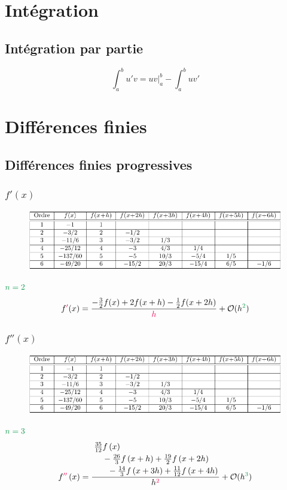 \documentclass[]{article}
\begin{document}
\begin{multicols}{3}











\section{Intégration}
\subsection{Intégration par partie}
$$\int_{a}^{b}u'v=uv\Big|_{a}^{b}-\int_{a}^{b}uv'$$
\section{Différences finies}
\subsection{Différences finies progressives}
\subsubsection{$f'(x)$}
\begin{figure}[H]
\centering
\includegraphics[width=\columnwidth,page=1]{diff_finies_tableaux.pdf}
\end{figure}
$\textcolor{ForestGreen}{n=2}$
$$f\textcolor{OrangeRed}{'}(x)=\frac{-\frac{3}{2}f(x)+2f(x+h)-\frac{1}{2}f(x+2h)}{\textcolor{OrangeRed}{h}}+\mathcal{O}(h^{\textcolor{ForestGreen}{2}})$$
\subsubsection{$f''(x)$}
\begin{figure}[H]
\centering
\includegraphics[width=\columnwidth,page=2]{diff_finies_tableaux.pdf}
\end{figure}
$\textcolor{ForestGreen}{n=3}$
$$f\textcolor{OrangeRed}{''}\left(x\right)=\frac{\splitdfrac{\splitdfrac{\frac{35}{12}f\left(x\right)}{-\frac{26}{3}f\left(x+h\right)+\frac{19}{2}f\left(x+2h\right)}}{-\frac{14}{3}f\left(x+3h\right)+\frac{11}{12}f\left(x+4h\right)}}{h^{\textcolor{OrangeRed}{2}}}+\mathcal{O}(h^{\textcolor{ForestGreen}{3}})$$

\end{multicols}
\end{document}
